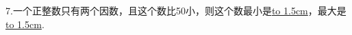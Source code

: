 \question 7.一个正整数只有两个因数，且这个数比50小，则这个数最小是\underline{\hbox to 1.5cm{}}，最大是\underline{\hbox to 1.5cm{}}.